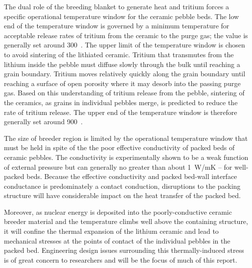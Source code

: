 The dual role of the breeding blanket to generate heat and tritium forces a specific operational temperature window for the ceramic pebble beds. The low end of the temperature window is governed by a minimum temperature for acceptable release rates of tritium from the ceramic to the purge gas; the value is generally set around 300~\celsius. The upper limit of the temperature window is chosen to avoid sintering of the lithiated ceramic. Tritium that transmutes from the lithium inside the pebble must diffuse slowly through the bulk until reaching a grain boundary. Tritium moves relatively quickly along the grain boundary until reaching a surface of open porosity where it may desorb into the passing purge gas.\cite{Federici1990} Based on this understanding of tritium release from the pebble, sintering of the ceramics, as grains in individual pebbles merge, is predicted to reduce the rate of tritium release. The upper end of the temperature window is therefore generally set around 900~\celsius.

The size of breeder region is limited by the operational temperature window that must be held in spite of the the poor effective conductivity of packed beds of ceramic pebbles. The conductivity is experimentally shown to be a weak function of external pressure but can generally no greater than about \si{1 W/{mK}} -- for well-packed beds. Because the effective conductivity and packed bed-wall interface conductance is predominately a contact conduction, disruptions to the packing structure will have considerable impact on the heat transfer of the packed bed.

Moreover, as nuclear energy is deposited into the poorly-conductive ceramic breeder material and the temperature climbs well above the containing structure, it will confine the thermal expansion of the lithium ceramic and lead to mechanical stresses at the points of contact of the individual pebbles in the packed bed. Engineering design issues surrounding this thermally-induced stress is of great concern to researchers and will be the focus of much of this report.





